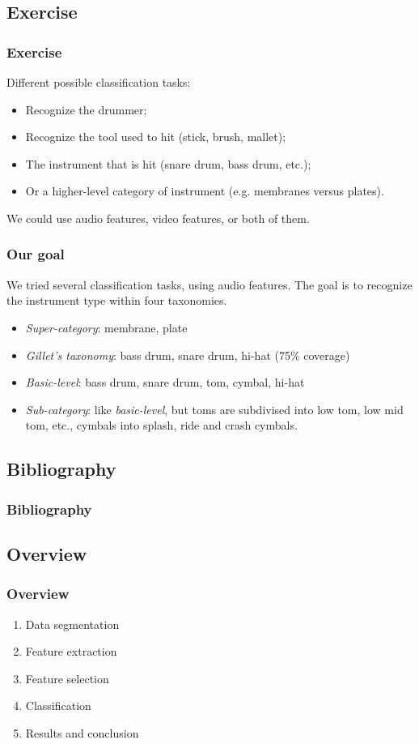 \documentclass{beamer}
\begin{document}
    \subsection{Exercise}
    \begin{frame}
        \frametitle{Exercise}
        Different possible classification tasks:
        \begin{itemize}
            \item Recognize the drummer;
            \item Recognize the tool used to hit (stick, brush, mallet);
            \item The instrument that is hit (snare drum, bass drum, etc.);
            \item Or a higher-level category of instrument (e.g. membranes versus plates).
        \end{itemize}
        We could use audio features, video features, or both of them.
    \end{frame}
    \begin{frame}
        \frametitle{Our goal}
        We tried several classification tasks, using audio features. The goal is to recognize the instrument type within four taxonomies.
        \begin{itemize}

            \item \emph{Super-category}: membrane, plate
            \item \emph{Gillet's taxonomy}: bass drum, snare drum, hi-hat (75\% coverage)
            \item \emph{Basic-level}: bass drum, snare drum, tom, cymbal, hi-hat
            \item \emph{Sub-category}: like \emph{basic-level}, but toms are subdivised into low tom, low mid tom, etc., cymbals into splash, ride and crash cymbals.
        \end{itemize}
    \end{frame}
    \subsection{Bibliography}
    \begin{frame}
        \frametitle{Bibliography}
        \footnotesize 
        \nocite{*}
        
        
        \normalsize
    \end{frame}
    \subsection{Overview}
    \begin{frame}
        \frametitle{Overview}
        \begin{enumerate}
            \item Data segmentation
            \item Feature extraction
            \item Feature selection
            \item Classification
            \item Results and conclusion
        \end{enumerate}
    \end{frame}
    
\end{document}
